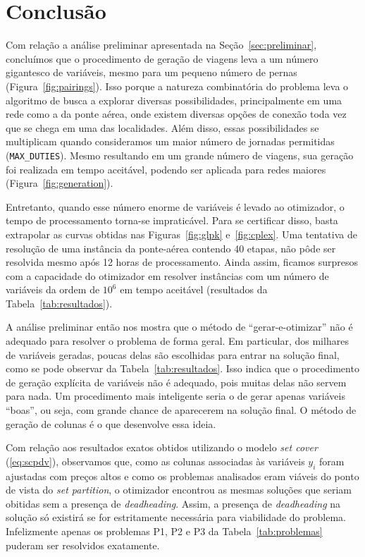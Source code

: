 \zerar
\chapter{Conclusão}
\label{cap:conclusao}

Com relação a análise preliminar apresentada na Seção~\ref{sec:preliminar}, concluímos que o
procedimento de geração de viagens leva a um número gigantesco de variáveis, mesmo para um pequeno
número de pernas (Figura~\ref{fig:pairings}). Isso porque a natureza combinatória do problema leva o
algoritmo de busca a explorar diversas possibilidades, principalmente em uma rede como a da ponte
aérea, onde existem diversas opções de conexão toda vez que se chega em uma das localidades. Além
disso, essas possibilidades se multiplicam quando consideramos um maior número de jornadas
permitidas (\verb|MAX_DUTIES|). Mesmo resultando em um grande número de viagens, sua geração foi
realizada em tempo aceitável, podendo ser aplicada para redes maiores (Figura~\ref{fig:generation}).

Entretanto, quando esse número enorme de variáveis é levado ao otimizador, o tempo de processamento
torna-se impraticável. Para se certificar disso, basta extrapolar as curvas obtidas nas
Figuras~\ref{fig:glpk} e~\ref{fig:cplex}. Uma tentativa de resolução de uma instância da ponte-aérea
contendo 40 etapas, não pôde ser resolvida mesmo após 12 horas de processamento. Ainda assim,
ficamos surpresos com a capacidade do otimizador em resolver instâncias com um número de variáveis
da ordem de $10^6$ em tempo aceitável (resultados da Tabela~\ref{tab:resultados}).

A análise preliminar então nos mostra que o método de ``gerar-e-otimizar'' não é adequado para
resolver o problema de forma geral. Em particular, dos milhares de variáveis geradas, poucas delas
são escolhidas para entrar na solução final, como se pode observar da Tabela~\ref{tab:resultados}.
Isso indica que o procedimento de geração explícita de variáveis não é adequado, pois muitas delas
não servem para nada. Um procedimento mais inteligente seria o de gerar apenas variáveis ``boas'',
ou seja, com grande chance de aparecerem na solução final. O método de geração de colunas é o que
desenvolve essa ideia.

Com relação aos resultados exatos obtidos utilizando o modelo {\it set cover} (\ref{eq:scpdv}), 
observamos que, como as colunas associadas às variáveis $y_i$ foram ajustadas com preços altos e 
como os problemas analisados eram viáveis do ponto de vista do {\it set partition}, o otimizador 
encontrou as mesmas soluções que seriam obitidas sem a presença de {\it deadheading}. Assim, a 
presença de {\it deadheading} na solução só existirá se for estritamente necessária para 
viabilidade do problema. Infelizmente apenas os problemas P1, P2 e P3 da Tabela~\ref{tab:problemas}
puderam ser resolvidos exatamente.

